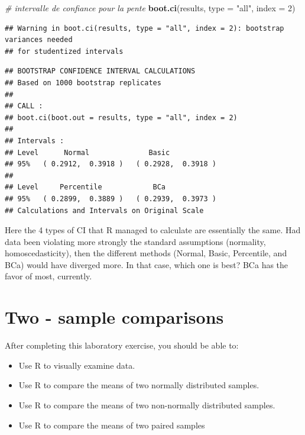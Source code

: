 \documentclass[
  12pt,
]{book}
\newenvironment{Shaded}{\begin{snugshade}}{\end{snugshade}}
\newcommand{\CommentTok}[1]{\textcolor[rgb]{0.56,0.35,0.01}{\textit{#1}}}
\newcommand{\DataTypeTok}[1]{\textcolor[rgb]{0.13,0.29,0.53}{#1}}
\newcommand{\DecValTok}[1]{\textcolor[rgb]{0.00,0.00,0.81}{#1}}
\newcommand{\KeywordTok}[1]{\textcolor[rgb]{0.13,0.29,0.53}{\textbf{#1}}}
\newcommand{\NormalTok}[1]{#1}
\newcommand{\StringTok}[1]{\textcolor[rgb]{0.31,0.60,0.02}{#1}}
\providecommand{\tightlist}{%
  \setlength{\itemsep}{0pt}\setlength{\parskip}{0pt}}
\begin{document}
\begin{Shaded}
\begin{Highlighting}[]
\CommentTok{\# intervalle de confiance pour la pente}
\KeywordTok{boot.ci}\NormalTok{(results, }\DataTypeTok{type =} \StringTok{"all"}\NormalTok{, }\DataTypeTok{index =} \DecValTok{2}\NormalTok{)}
\end{Highlighting}
\end{Shaded}

\begin{verbatim}
## Warning in boot.ci(results, type = "all", index = 2): bootstrap variances needed
## for studentized intervals
\end{verbatim}

\begin{verbatim}
## BOOTSTRAP CONFIDENCE INTERVAL CALCULATIONS
## Based on 1000 bootstrap replicates
## 
## CALL : 
## boot.ci(boot.out = results, type = "all", index = 2)
## 
## Intervals : 
## Level      Normal              Basic         
## 95%   ( 0.2912,  0.3918 )   ( 0.2928,  0.3918 )  
## 
## Level     Percentile            BCa          
## 95%   ( 0.2899,  0.3889 )   ( 0.2939,  0.3973 )  
## Calculations and Intervals on Original Scale
\end{verbatim}

Here the 4 types of CI that R managed to calculate are essentially the same. Had data been violating more strongly the standard assumptions (normality, homoscedasticity), then the different methods (Normal, Basic, Percentile, and BCa) would have diverged more. In that case, which one is best? BCa has the favor of most, currently.

\hypertarget{two---sample-comparisons}{%
\chapter{Two - sample comparisons}\label{two---sample-comparisons}}

After completing this laboratory exercise, you should be able to:

\begin{itemize}
\tightlist
\item
  Use R to visually examine data.
\item
  Use R to compare the means of two normally distributed samples.
\item
  Use R to compare the means of two non-normally distributed
  samples.
\item
  Use R to compare the means of two paired samples
\end{itemize}
\end{document}
